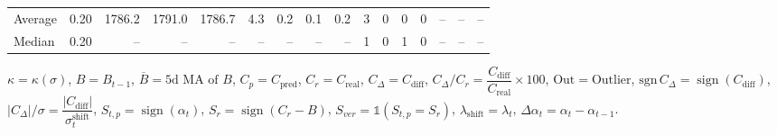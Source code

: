 \begin{threeparttable}
{\begin{tabular}{lrrrrrrrrrrrrrrr}
Average &     0.20 & 1786.2 & 1791.0 & 1786.7 &        4.3 &            0.2 &                      0.1 &                 0.2 &              3 &         0 &     0 &         0 &         -- &        -- &             -- \\
 Median &     0.20 &     -- &     -- &     -- &         -- &             -- &                       -- &                  -- &              1 &         0 &     1 &         0 &         -- &        -- &             -- \\
\bottomrule
\end{tabular}
}
\begin{tablenotes}\footnotesize
\item $\kappa=\kappa(\sigma)$, $B=B_{t-1}$, $\overline{B}=\text{5d MA of }B$, $C_p=C_{\text{pred}}$, $C_r=C_{\text{real}}$, $C_\Delta=C_{\text{diff}}$, $C_\Delta/C_r=\dfrac{C_{\text{diff}}}{C_{\text{real}}}\times100$, $\mathrm{Out}=\text{Outlier}$, $\mathrm{sgn}\,C_\Delta=\operatorname{sign}(C_{\text{diff}})$, $|C_\Delta|/\sigma=\dfrac{|C_{\text{diff}}|}{\sigma_t^{\text{shift}}}$, $S_{t,p}=\operatorname{sign}(\alpha_t)$, $S_r=\operatorname{sign}(C_r - B)$, $S_{ver}=\mathbb{1}(S_{t,p}=S_r)$, $\lambda_{\text{shift}}=\lambda_t$, $\Delta\alpha_t=\alpha_t-\alpha_{t-1}$.\end{tablenotes}
\end{threeparttable}
\endgroup

